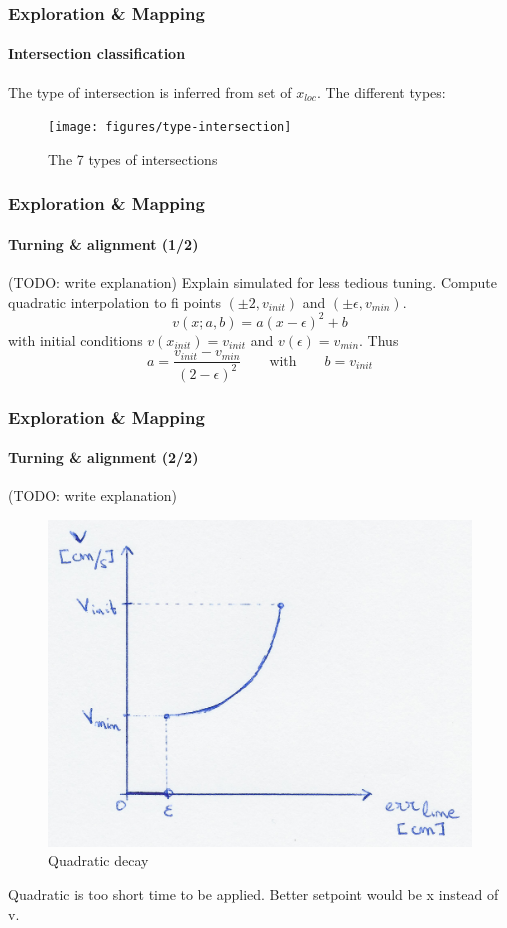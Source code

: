 \documentclass[10pt]{beamer}
\begin{document}

\begin{frame}
\frametitle{Exploration \& Mapping}
\framesubtitle{Intersection classification}
The type of intersection is inferred from set of $x_{loc}$. The different types:
\begin{figure}[hbtp]
\centering
\texttt{[image: figures/type-intersection]}
\caption{The 7 types of intersections}
\label{fig:type-intersection}
\end{figure}
\end{frame}


\begin{frame}[label={frame:align}]
\frametitle{Exploration \& Mapping}
\framesubtitle{Turning \& alignment (1/2)}
(TODO: write explanation)
Explain simulated for less tedious tuning.
Compute quadratic interpolation to fi points $(\pm2,v_{init})$ and $(\pm\epsilon,v_{min})$.
$$
v(x;a,b) = a(x-\epsilon)^2+b 
$$
with initial conditions $v(x_{init}) = v_{init}$ and $v(\epsilon) = v_{min}$. Thus
$$
a = \frac{v_{init}-v_{min}}{(2-\epsilon)^2}
\qquad\text{with}\qquad
b = v_{init}
$$
\end{frame}

\begin{frame}
\frametitle{Exploration \& Mapping}
\framesubtitle{Turning \& alignment (2/2)}
(TODO: write explanation)
\begin{figure}[hbtp]
\centering
\includegraphics[scale=0.07]{figures/turn-align}
\caption{Quadratic decay}
\label{fig:quad-decay}
\end{figure}
Quadratic is too short time to be applied. Better setpoint would be x instead of v.
\end{frame}
\end{document}
